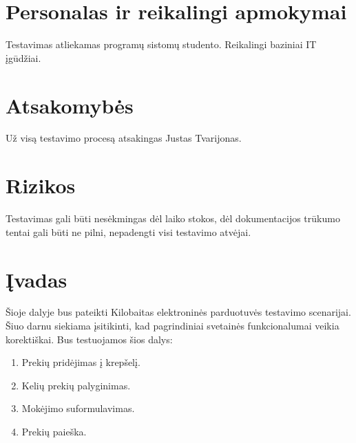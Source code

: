 \documentclass{VUMIFPSkursinis}
\begin{document}
\section{Personalas ir reikalingi apmokymai}
Testavimas atliekamas programų sistomų studento. Reikalingi baziniai IT įgūdžiai.
\section{Atsakomybės}
Už visą testavimo procesą atsakingas Justas Tvarijonas.
\section{Rizikos}
Testavimas gali būti nesėkmingas dėl laiko stokos, dėl dokumentacijos trūkumo tentai gali būti ne pilni, nepadengti visi testavimo atvėjai.
\section{Įvadas}
Šioje dalyje bus pateikti Kilobaitas elektroninės parduotuvės testavimo scenarijai. Šiuo darnu siekiama įsitikinti, kad pagrindiniai svetainės funkcionalumai veikia korektiškai. Bus testuojamos šios dalys:
\begin{enumerate}
	\item Prekių pridėjimas į krepšelį.
	\item Kelių prekių palyginimas.
	\item Mokėjimo suformulavimas.
	\item Prekių paieška.
\end{enumerate}
\end{document}
